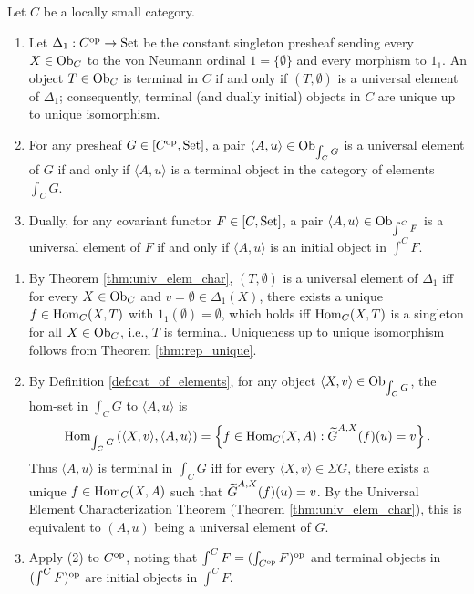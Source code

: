 \documentclass[10pt,a4paper]{article}
\begin{document}
\begin{theorem}\label{thm:grothendieck_rep}
Let $C$ be a locally small category.
\begin{enumerate}
\item Let $\Delta_1 : C^{\textrm{op}} \to {\textrm{Set}}$ be the constant singleton presheaf sending every $X \in {\textrm{Ob}}_C$ to the von Neumann ordinal $1 = \{\emptyset\}$ and every morphism to $1_1$. An object $T \in {\textrm{Ob}}_C$ is terminal in $C$ if and only if $(T, \emptyset)$ is a universal element of $\Delta_1$; consequently, terminal (and dually initial) objects in $C$ are unique up to unique isomorphism.
\item For any presheaf $G \in [C^{\textrm{op}}, {\textrm{Set}}]$, a pair $\langle A, u \rangle \in {\textrm{Ob}}_{\int_C G}$ is a universal element of $G$ if and only if $\langle A, u \rangle$ is a terminal object in the category of elements $\int_C G$.
\item Dually, for any covariant functor $F \in [C, {\textrm{Set}}]$, a pair $\langle A, u \rangle \in {\textrm{Ob}}_{\int^C F}$ is a universal element of $F$ if and only if $\langle A, u \rangle$ is an initial object in $\int^C F$.
\end{enumerate}
\end{theorem}
\myprf
\begin{enumerate}
\item By Theorem \ref{thm:univ_elem_char}, $(T, \emptyset)$ is a universal element of $\Delta_1$ iff for every $X \in {\textrm{Ob}}_C$ and $v = \emptyset \in \Delta_1(X)$, there exists a unique $f \in {\textrm{Hom}}_C(X, T)$ with $1_1(\emptyset) = \emptyset$, which holds iff ${\textrm{Hom}}_C(X, T)$ is a singleton for all $X \in {\textrm{Ob}}_C$, i.e., $T$ is terminal. Uniqueness up to unique isomorphism follows from Theorem \ref{thm:rep_unique}.
\item By Definition \ref{def:cat_of_elements}, for any object $\langle X, v \rangle \in {\textrm{Ob}}_{\int_C G}$, the hom-set in $\int_C G$ to $\langle A, u \rangle$ is
$${\textrm{Hom}}_{\int_C G}\left(\langle X, v \rangle, \langle A, u \rangle\right) = \left\{ f \in {\textrm{Hom}}_C(X, A) : {\widetilde{G}\textrm{}}^{A,X}(f)(u) = v \right\}.$$
Thus $\langle A, u \rangle$ is terminal in $\int_C G$ iff for every $\langle X, v \rangle \in \Sigma G$, there exists a unique $f \in {\textrm{Hom}}_C(X, A)$ such that ${\widetilde{G}\textrm{}}^{A,X}(f)(u) = v$. By the Universal Element Characterization Theorem (Theorem \ref{thm:univ_elem_char}), this is equivalent to $(A, u)$ being a universal element of $G$.
\item Apply (2) to $C^{\textrm{op}}$, noting that $\int^C F = (\int_{C^{\textrm{op}}} F)^{\textrm{op}}$ and terminal objects in $(\int^C F)^{\textrm{op}}$ are initial objects in $\int^C F$.
\end{enumerate}
\myqed
\end{document}
